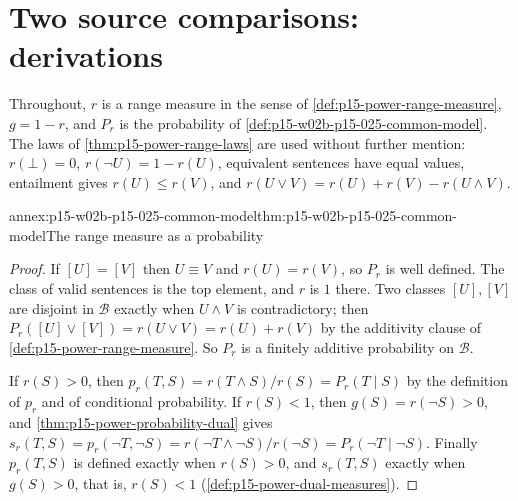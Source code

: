 \section{Two source comparisons: derivations}
\label{sec:p15-w02b-p15-025-annex}

Throughout, \(r\) is a range measure in the sense of
\cref{def:p15-power-range-measure}, \(g=1-r\), and \(P_r\) is the
probability of \cref{def:p15-w02b-p15-025-common-model}. The laws of
\cref{thm:p15-power-range-laws} are used without further mention:
\(r(\bot)=0\), \(r(\neg U)=1-r(U)\), equivalent sentences have equal
values, entailment gives \(r(U)\le r(V)\), and
\(r(U\vee V)=r(U)+r(V)-r(U\wedge V)\).

\begin{annexitem}{annex:p15-w02b-p15-025-common-model}{thm:p15-w02b-p15-025-common-model}{The range measure as a probability}
\begin{proof}
If \([U]=[V]\) then \(U\equiv V\) and \(r(U)=r(V)\), so \(P_r\) is well
defined. The class of valid sentences is the top element, and \(r\) is
\(1\) there. Two classes \([U],[V]\) are disjoint in \(\mathcal B\)
exactly when \(U\wedge V\) is contradictory; then
\(P_r([U]\vee[V])=r(U\vee V)=r(U)+r(V)\) by the additivity clause of
\cref{def:p15-power-range-measure}. So \(P_r\) is a finitely additive
probability on \(\mathcal B\).

If \(r(S)>0\), then \(p_r(T,S)=r(T\wedge S)/r(S)=P_r(T\mid S)\) by the
definition of \(p_r\) and of conditional probability. If \(r(S)<1\),
then \(g(S)=r(\neg S)>0\), and \cref{thm:p15-power-probability-dual}
gives \(s_r(T,S)=p_r(\neg T,\neg S)=r(\neg T\wedge\neg S)/r(\neg S)
=P_r(\neg T\mid\neg S)\). Finally \(p_r(T,S)\) is defined exactly when
\(r(S)>0\), and \(s_r(T,S)\) exactly when \(g(S)>0\), that is,
\(r(S)<1\) (\cref{def:p15-power-dual-measures}).
\end{proof}
\end{annexitem}

